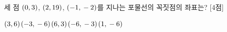 세 점 $(0{,}\mkern3mu 3)$, $(2{,}\mkern3mu 19)$, $(-1{,}\mkern3mu -2)$를 지나는 포물선의 꼭짓점의 좌표는? \mbox{[4점]}
\begin{choices32}{$(3{,}\mkern3mu 6)$}{$(-3{,}\mkern3mu -6)$}{$(6{,}\mkern3mu 3)$}{$(-6{,}\mkern3mu -3)$}{$(1{,}\mkern3mu -6)$}\end{choices32}
